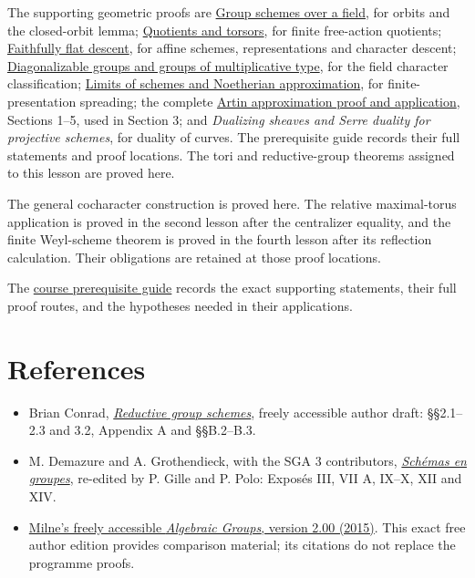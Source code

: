 \documentclass[11pt,a4paper,openany]{report}
\providecommand{\tightlist}{\setlength{\itemsep}{0pt}\setlength{\parskip}{0pt}}
\begin{document}
The supporting geometric proofs are \href{https://github.com/KokunoYumeto/open-math-courses/blob/main/docs/courses/AG-GS/AG-GS-03.html}{Group schemes over a field}, for orbits and the closed-orbit lemma; \href{https://github.com/KokunoYumeto/open-math-courses/blob/main/docs/courses/AG-GS/AG-GS-04.html}{Quotients and torsors}, for finite free-action quotients; \href{prerequisites.html\#prerequisite-ag-dfg-02}{Faithfully flat descent}, for affine schemes, representations and character descent; \href{https://github.com/KokunoYumeto/open-math-courses/blob/d02d0a3669f42579db037cd44de1d113fdd770a1/docs/courses/AG-GS/src/diagonalizable-groups.md}{Diagonalizable groups and groups of multiplicative type}, for the field character classification; \href{https://github.com/KokunoYumeto/open-math-courses/blob/main/docs/courses/AG-MO/AG-MO-03.html}{Limits of schemes and Noetherian approximation}, for finite-presentation spreading; the complete \href{https://github.com/KokunoYumeto/open-math-courses/blob/main/docs/courses/AG-RG/AG-RG-S05.md}{Artin approximation proof and application}, Sections 1--5, used in Section 3; and \emph{Dualizing sheaves and Serre duality for projective schemes}, for duality of curves. The prerequisite guide records their full statements and proof locations. The tori and reductive-group theorems assigned to this lesson are proved here.

The general cocharacter construction is proved here. The relative maximal-torus application is proved in the second lesson after the centralizer equality, and the finite Weyl-scheme theorem is proved in the fourth lesson after its reflection calculation. Their obligations are retained at those proof locations.

The \href{prerequisites.html}{course prerequisite guide} records the exact supporting statements, their full proof routes, and the hypotheses needed in their applications.

\section{References}\label{AG-RG-01-references}

\begin{itemize}
\tightlist
\item
  Brian Conrad, \href{https://math.stanford.edu/~conrad/papers/luminysga3.pdf}{\emph{Reductive group schemes}}, freely accessible author draft: §§2.1--2.3 and 3.2, Appendix A and §§B.2--B.3.
\item
  M. Demazure and A. Grothendieck, with the SGA 3 contributors, \href{https://webusers.imj-prg.fr/~patrick.polo/SGA3/}{\emph{Schémas en groupes}}, re-edited by P. Gille and P. Polo: Exposés III, VII A, IX--X, XII and XIV.
\item
  \href{https://www.jmilne.org/math/CourseNotes/iAG200.pdf}{Milne's freely accessible \emph{Algebraic Groups}, version 2.00 (2015)}. This exact free author edition provides comparison material; its citations do not replace the programme proofs.
\end{itemize}
\end{document}

